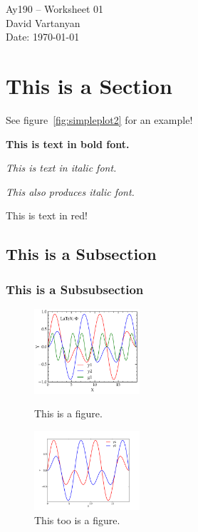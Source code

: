\documentclass[11pt,letterpaper]{article}
\begin{document}
\begin{center}
\Large
Ay190 -- Worksheet 01\\
David Vartanyan\\
Date: \today
\end{center}

\section{This is a Section}

See figure~\ref{fig:simpleplot2} for an example!

{\bf This is text in bold font.}

\emph{This is text in italic font.}

{\it This also produces italic font.}

{\color{red} This is text in red!}

\subsection{This is a Subsection}

\subsubsection{This is a Subsubsection}

\begin{figure}[bth]
\centering
\includegraphics[width=0.35\textwidth]{simpleplot2.pdf}
\caption{This is a figure.}
\label{fig:simpleplot2}
\includegraphics[width=0.35\textwidth]{simpleplot.pdf}
\caption{This too is a figure.}
\label{fig:simpleplot1}
\end{figure}
\end{document}
